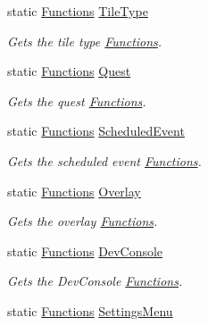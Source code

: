 \begin{DoxyCompactItemize}
static \hyperlink{class_functions}{Functions} \hyperlink{class_functions_manager_a786579d69f98ed215b3430f8467d51e1}{Tile\+Type}
\begin{DoxyCompactList}\small\item\em Gets the tile type \hyperlink{class_functions}{Functions}. \end{DoxyCompactList}\item 
static \hyperlink{class_functions}{Functions} \hyperlink{class_functions_manager_a1d8177de448c438576e8df9bf326768a}{Quest}
\begin{DoxyCompactList}\small\item\em Gets the quest \hyperlink{class_functions}{Functions}. \end{DoxyCompactList}\item 
static \hyperlink{class_functions}{Functions} \hyperlink{class_functions_manager_adfc5d240b3d8924d262cf78e3747b2c3}{Scheduled\+Event}
\begin{DoxyCompactList}\small\item\em Gets the scheduled event \hyperlink{class_functions}{Functions}. \end{DoxyCompactList}\item 
static \hyperlink{class_functions}{Functions} \hyperlink{class_functions_manager_a99ef54ef4c8b8ad56633818c211732f0}{Overlay}
\begin{DoxyCompactList}\small\item\em Gets the overlay \hyperlink{class_functions}{Functions}. \end{DoxyCompactList}\item 
static \hyperlink{class_functions}{Functions} \hyperlink{class_functions_manager_a8abbe32f4c541d657ba4df5acf2e8b0a}{Dev\+Console}
\begin{DoxyCompactList}\small\item\em Gets the Dev\+Console \hyperlink{class_functions}{Functions}. \end{DoxyCompactList}\item 
static \hyperlink{class_functions}{Functions} \hyperlink{class_functions_manager_aa0e89c5eaec08e891e29c93ee7181ead}{Settings\+Menu}

\end{DoxyCompactItemize}
